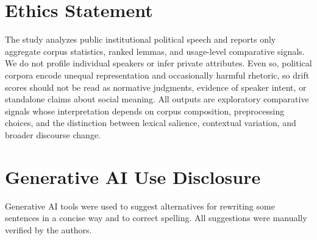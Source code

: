 \documentclass[12pt]{article}
\begin{document}
\section{Ethics Statement}
\label{sec:ethics}

The study analyzes public institutional political speech and reports only
aggregate corpus statistics, ranked lemmas, and usage-level comparative signals.
We do not profile individual speakers or infer private attributes. Even so,
political corpora encode unequal representation and occasionally harmful
rhetoric, so drift scores should not be read as normative judgments, evidence
of speaker intent, or standalone claims about social meaning. All outputs are
exploratory comparative signals whose interpretation depends on corpus
composition, preprocessing choices, and the distinction between lexical
salience, contextual variation, and broader discourse change.

\section{Generative AI Use Disclosure}

Generative AI tools were used to suggest alternatives for rewriting some sentences in a concise way and to correct spelling. All suggestions were manually verified by the authors.



\end{document}
